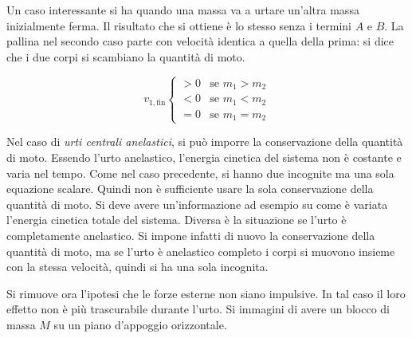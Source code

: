 \begin{figure}[htpb]
\end{figure}
\FloatBarrier
Un caso interessante si ha quando una massa va a urtare un'altra massa inizialmente ferma. Il risultato che si ottiene è lo stesso senza i termini $A$ e $B$. La pallina nel secondo caso parte con velocità identica a quella della prima: si dice che i due corpi si scambiano la quantità di moto.

\[
	v_{1,\text{fin}} \begin{cases}  >0 & \text{se $m_1>m_2$} \\ <0 & \text{se $m_1<m_2$} \\ =0 &\text{se $m_1=m_2$} \end{cases}
\]

Nel caso di \textit{urti centrali anelastici}, si può imporre la conservazione della quantità di moto. Essendo l'urto anelastico, l'energia cinetica del sistema non è costante e varia nel tempo. Come nel caso precedente, si hanno due incognite ma una sola equazione scalare. Quindi non è sufficiente usare la sola conservazione della quantità di moto. Si deve avere un'informazione ad esempio su come è variata l'energia cinetica totale del sistema. Diversa è la situazione se l'urto è completamente anelastico. Si impone infatti di nuovo la conservazione della quantità di moto, ma se l'urto è anelastico completo i corpi si muovono insieme con la stessa velocità, quindi si ha una sola incognita.

Si rimuove ora l'ipotesi che le forze esterne non siano impulsive. In tal caso il loro effetto non è più trascurabile durante l'urto. Si immagini di avere un blocco di massa $M$ su un piano d'appoggio orizzontale.

